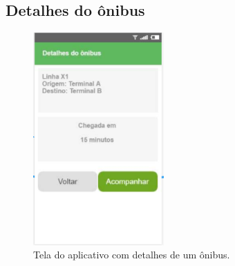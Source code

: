 \documentclass[
	12pt,				%
	oneside,			%
	a4paper,			%
	brazil				%
]{abntex2}
\begin{document}
\newpage

\subsection{Detalhes do ônibus}

\begin{figure}[!h]
\centering
\includegraphics[width=5cm, center]{images/tela-4-informacoes-do-onibus.PNG}
\caption{Tela do aplicativo com detalhes de um ônibus.}
\label{Rotulo}
\end{figure}
\end{document}
